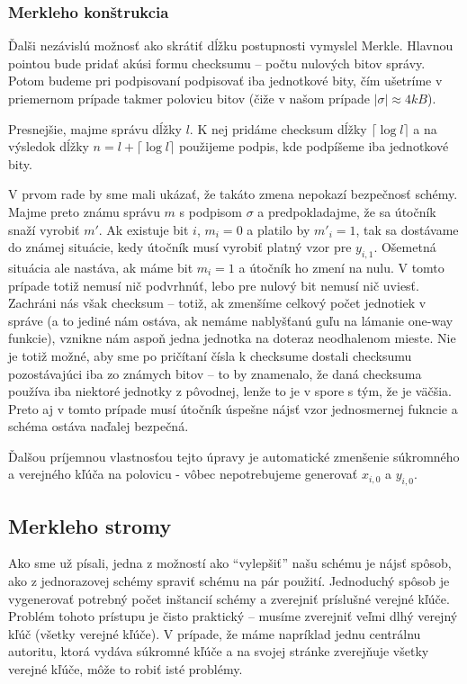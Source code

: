 \subsubsection{Merkleho konštrukcia}
Ďalši nezávislú možnosť ako skrátiť dĺžku postupnosti vymyslel
Merkle. Hlavnou pointou bude pridať akúsi formu checksumu -- počtu
nulových bitov správy. Potom budeme pri podpisovaní podpisovať iba
jednotkové bity, čím ušetríme v priemernom prípade takmer polovicu bitov
(čiže v našom prípade $|\sigma| \approx 4 \unit{kB}$).

Presnejšie, majme správu dĺžky $l$. K nej pridáme checksum dĺžky
$\lceil \log l \rceil$ a na výsledok dĺžky $n=l+\lceil \log l \rceil$
použijeme podpis, kde podpíšeme iba jednotkové bity.

V prvom rade by sme mali ukázať, že takáto zmena nepokazí bezpečnosť
schémy. Majme preto známu správu $m$ s podpisom $\sigma$ a
predpokladajme, že sa útočník snaží vyrobiť $m'$.
Ak existuje bit $i$, $m_i=0$ a platilo by $m'_i=1$, tak sa dostávame
do známej situácie, kedy útočník musí vyrobiť platný vzor pre $y_{i,1}$.
Ošemetná situácia ale nastáva, ak máme bit $m_i=1$ a útočník ho zmení
na nulu. V tomto prípade totiž nemusí nič podvrhnúť, lebo pre nulový
bit nemusí nič uviesť. Zachráni nás však checksum -- totiž, ak zmenšíme
celkový počet jednotiek v správe (a to jediné nám ostáva, ak nemáme
nablyšťanú guľu na lámanie one-way funkcie), vznikne nám aspoň jedna
jednotka na doteraz neodhalenom mieste. Nie je totiž možné, aby sme
po pričítaní čísla k checksume dostali checksumu pozostávajúci iba zo
známych bitov -- to by znamenalo, že daná checksuma používa iba
niektoré jednotky z pôvodnej, lenže to je v spore s tým, že je
väčšia. Preto aj v tomto prípade musí útočník úspešne nájsť vzor
jednosmernej fukncie a schéma ostáva naďalej bezpečná.

Ďalšou príjemnou vlastnosťou tejto úpravy je automatické zmenšenie
súkromného a verejného kľúča na polovicu - vôbec nepotrebujeme
generovať $x_{i,0}$ a $y_{i,0}$.

\subsection{Merkleho stromy}

Ako sme už písali, jedna z možností ako ``vylepšiť'' našu schému
je nájsť spôsob, ako z jednorazovej schémy spraviť schému na pár
použití. Jednoduchý spôsob je vygenerovať potrebný počet inštancií
schémy a zverejniť príslušné verejné kľúče. Problém tohoto prístupu je
čisto praktický -- musíme zverejniť veľmi dlhý verejný kľúč (všetky
verejné kľúče). V prípade, že máme napríklad jednu centrálnu autoritu,
ktorá vydáva súkromné kľúče a na svojej stránke zverejňuje všetky
verejné kľúče, môže to robiť isté problémy.

